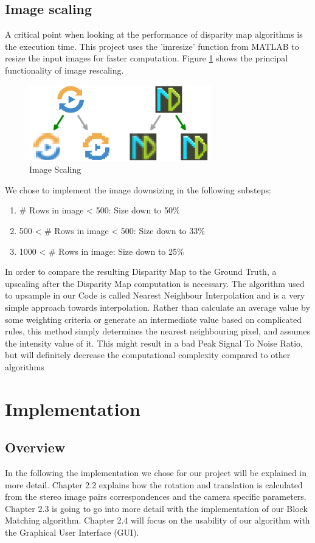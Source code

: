 \documentclass[doctype=Studienarbeit,BCOR=15mm]{ldvbook}
\begin{document}
\section{Image scaling}
A critical point when looking at the performance of disparity map algorithms is the execution time. This project uses the 'imresize' function from MATLAB to resize the input images for faster computation. Figure \ref{fig:imscaling} shows the principal functionality of image rescaling.

\begin{figure}[H]
\begin{center}
  \includegraphics[width=0.5\linewidth]{imscaling.png}
  \caption{Image Scaling}
  \label{fig:imscaling}
  \end{center}
\end{figure}

We chose to implement the image downsizing in the following substeps:
\begin{enumerate}
\item \# Rows in image < 500: Size down to 50\%
\item 500 < \# Rows in image < 500: Size down to 33\%
\item 1000 < \# Rows in image: Size down to 25\%
\end{enumerate}

In order to compare the resulting Disparity Map to the Ground Truth, a upscaling after the Disparity Map computation is necessary. The algorithm used to upsample in our Code is called Nearest Neighbour Interpolation \cite{NNI} and is a very simple approach towards interpolation. Rather than calculate an average value by some weighting criteria or generate an intermediate value based on complicated rules, this method simply determines the nearest neighbouring pixel, and assumes the intensity value of it. This might result in a bad Peak Signal To Noise Ratio, but will definitely decrease the computational complexity compared to other algorithms


\chapter{Implementation}
\section{Overview}
In the following the implementation we chose for our project will be explained in more detail. Chapter 2.2 explains how the rotation and translation is calculated from the stereo image pairs correspondences and the camera specific parameters. Chapter 2.3 is going to go into more detail with the implementation of our Block Matching algorithm. Chapter 2.4 will focus on the usability of our algorithm with the Graphical User Interface (GUI).
\end{document}
